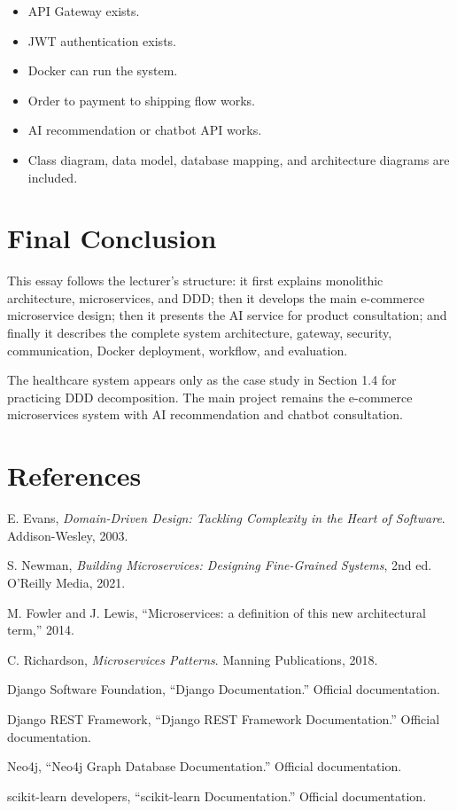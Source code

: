 \documentclass[12pt,a4paper]{article}
\begin{document}
\begin{itemize}
    \item API Gateway exists.
    \item JWT authentication exists.
    \item Docker can run the system.
    \item Order to payment to shipping flow works.
    \item AI recommendation or chatbot API works.
    \item Class diagram, data model, database mapping, and architecture diagrams are included.
\end{itemize}

\section*{Final Conclusion}

This essay follows the lecturer's structure: it first explains monolithic architecture, microservices, and DDD; then it develops the main e-commerce microservice design; then it presents the AI service for product consultation; and finally it describes the complete system architecture, gateway, security, communication, Docker deployment, workflow, and evaluation.

The healthcare system appears only as the case study in Section 1.4 for practicing DDD decomposition. The main project remains the e-commerce microservices system with AI recommendation and chatbot consultation.

\section*{References}

\begin{enumerate}[label={[\arabic*]}]
    \item E. Evans, \textit{Domain-Driven Design: Tackling Complexity in the Heart of Software}. Addison-Wesley, 2003.
    \item S. Newman, \textit{Building Microservices: Designing Fine-Grained Systems}, 2nd ed. O'Reilly Media, 2021.
    \item M. Fowler and J. Lewis, ``Microservices: a definition of this new architectural term,'' 2014.
    \item C. Richardson, \textit{Microservices Patterns}. Manning Publications, 2018.
    \item Django Software Foundation, ``Django Documentation.'' Official documentation.
    \item Django REST Framework, ``Django REST Framework Documentation.'' Official documentation.
    \item Neo4j, ``Neo4j Graph Database Documentation.'' Official documentation.
    \item scikit-learn developers, ``scikit-learn Documentation.'' Official documentation.
\end{enumerate}
\end{document}
